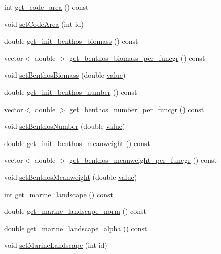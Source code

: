 \begin{DoxyCompactItemize}
\item 
int \mbox{\hyperlink{class_node_acf9fe395afce5b40c12b53e676eab3e2}{get\+\_\+code\+\_\+area}} () const
\item 
void \mbox{\hyperlink{class_node_a337a7639c5b6ed938b7112bd87b937dd}{set\+Code\+Area}} (int id)
\item 
double \mbox{\hyperlink{class_node_a54ee44b64bc2b4429597dd2d51d6112c}{get\+\_\+init\+\_\+benthos\+\_\+biomass}} () const
\item 
vector$<$ double $>$ \mbox{\hyperlink{class_node_adb37cca7dacc053b545fe64ddde0e648}{get\+\_\+benthos\+\_\+biomass\+\_\+per\+\_\+funcgr}} () const
\item 
void \mbox{\hyperlink{class_node_a137af4bc9baaade8deb67caa351be555}{set\+Benthos\+Biomass}} (double \mbox{\hyperlink{diffusion_8cpp_a4b41795815d9f3d03abfc739e666d5da}{value}})
\item 
double \mbox{\hyperlink{class_node_a69dde18d39cccfc8a84455c5cb826c13}{get\+\_\+init\+\_\+benthos\+\_\+number}} () const
\item 
vector$<$ double $>$ \mbox{\hyperlink{class_node_a156ae52ddc93e4d0a73e819b9052f547}{get\+\_\+benthos\+\_\+number\+\_\+per\+\_\+funcgr}} () const
\item 
void \mbox{\hyperlink{class_node_ab2d445d5ec48412eb15609c29e0b187b}{set\+Benthos\+Number}} (double \mbox{\hyperlink{diffusion_8cpp_a4b41795815d9f3d03abfc739e666d5da}{value}})
\item 
double \mbox{\hyperlink{class_node_ad1e72ce47a76a3772371f84f9dd0282e}{get\+\_\+init\+\_\+benthos\+\_\+meanweight}} () const
\item 
vector$<$ double $>$ \mbox{\hyperlink{class_node_a54c3ee3e02f144d28e0430b7ceba33ce}{get\+\_\+benthos\+\_\+meanweight\+\_\+per\+\_\+funcgr}} () const
\item 
void \mbox{\hyperlink{class_node_a3b20658d3a09d69a9e3981d6aa3dca90}{set\+Benthos\+Meanweight}} (double \mbox{\hyperlink{diffusion_8cpp_a4b41795815d9f3d03abfc739e666d5da}{value}})
\item 
int \mbox{\hyperlink{class_node_a2634dabdad22e482dd7e8ecc189e95b8}{get\+\_\+marine\+\_\+landscape}} () const
\item 
double \mbox{\hyperlink{class_node_a0011af7b829153b4e449067662b7e606}{get\+\_\+marine\+\_\+landscape\+\_\+norm}} () const
\item 
double \mbox{\hyperlink{class_node_ac93d5a7437cf3247602454affd3a9241}{get\+\_\+marine\+\_\+landscape\+\_\+alpha}} () const
\item 
void \mbox{\hyperlink{class_node_a3629dd6e92228c00d6f309af86d1b8de}{set\+Marine\+Landscape}} (int id)

\end{DoxyCompactItemize}
